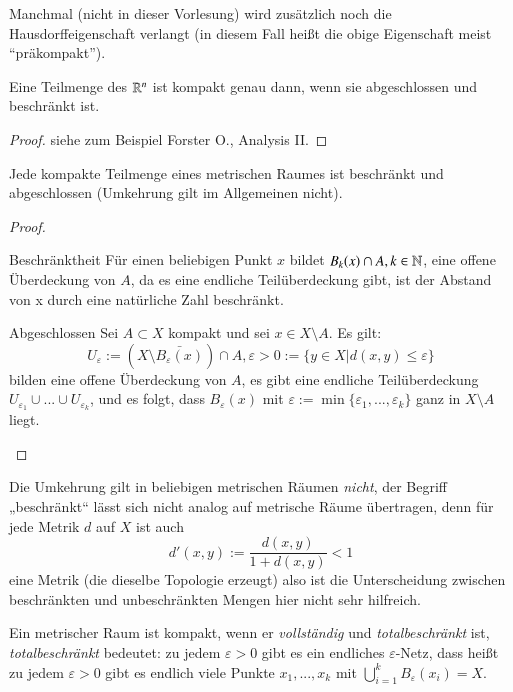 \documentclass[a4paper,10pt]{scrartcl}
\newcommand{\eps}{\varepsilon}
\begin{document}
\begin{note}\label{thm:6.3}
 Manchmal (nicht in dieser Vorlesung) wird zusätzlich noch die Hausdorffeigenschaft verlangt (in diesem Fall heißt die obige Eigenschaft meist "`präkompakt"').
\end{note}
\begin{st}\label{thm:6.4}
 Eine Teilmenge des $\mathbb{R}^n$ ist kompakt genau dann, wenn sie abgeschlossen und beschränkt ist.
\end{st}
\begin{proof}
 siehe zum Beispiel Forster O., Analysis II.
\end{proof}
\begin{st}\label{thm:6.5}
 Jede kompakte Teilmenge eines metrischen Raumes ist beschränkt und abgeschlossen (Umkehrung gilt im Allgemeinen nicht).
\end{st}
\begin{proof}
 \begin{seg}{Beschränktheit}
  Für einen beliebigen Punkt $x$ bildet $B_k(x)\cap A, k \in \mathbb{N}$, eine offene Überdeckung von $A$, da es eine endliche Teilüberdeckung gibt, 
ist der Abstand von x durch eine natürliche Zahl beschränkt.
 \end{seg}
\begin{seg}{Abgeschlossen}
 Sei $A\subset X$ kompakt und sei $x\in X\setminus A$. Es gilt:
\[
 U_\eps:=(X\setminus\bar{B_\eps(x)})\cap A, \eps>0 := \{ y\in X|d(x,y)\le \eps\}
\]
bilden eine offene Überdeckung von $A$, es gibt eine endliche Teilüberdeckung $U_{\eps_1}\cup... \cup U_{\eps_k}$, und es folgt, dass $B_\eps(x)$ mit $\eps:=\min\{\eps_1,...,\eps_k\}$ ganz in $X\setminus A$ liegt.

\fixme[fig26]
\end{seg}
\end{proof}
Die Umkehrung gilt in beliebigen metrischen Räumen \emph{nicht}, der Begriff „beschränkt“ lässt sich nicht analog auf metrische Räume übertragen, denn für jede Metrik $d$ auf $X$ ist auch
\[
 d'(x,y):=\frac{d(x,y)}{1+d(x,y)}<1
\]
eine Metrik (die dieselbe Topologie erzeugt) also ist die Unterscheidung zwischen beschränkten und unbeschränkten Mengen hier nicht sehr hilfreich.
\begin{note*}
 Ein metrischer Raum ist kompakt, wenn er \emph{vollständig} und \emph{totalbeschränkt} ist, \emph{totalbeschränkt} bedeutet: zu jedem $\eps>0$ gibt es ein endliches $\eps$-Netz, dass heißt zu jedem $\eps>0$ gibt es endlich viele Punkte $x_1,...,x_k$ mit $\bigcup_{i=1}^kB_\eps(x_i)=X$.
\end{note*}
\end{document}
